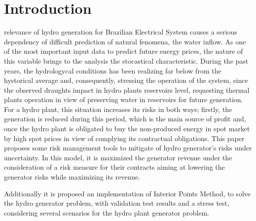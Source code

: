 \documentclass[a4paper]{IEEEtran}
\begin{document}
%
\IEEEpeerreviewmaketitle



\section{Introduction}
% 
% 
% 
% 
 relevance of hydro generation for Brazilian Electrical System causes a serious dependency of difficult prediction of natural fenomena, the water inflow. As one of the most important input data to predict future energy prices, the nature of this variable brings to the analysis the stocastical characteristic. During the past years, the hydrologycal conditions has been realizing far below from the hystorical average and, consequently, stressing the operation of the system, since the observed draughts impact in hydro plants reservoirs level, requesting thermal plants operation in view of preserving water in reservoirs for future generation. For a hydro plant, this situation increases its risks in both ways; firstly, the generation is reduced during this period, which is the main source of profit and, once the hydro plant is obligated to buy the non-produced energy in spot market by high spot prices in view of complying its contractual obligations. This paper proposes some risk management tools to mitigate of hydro generator's risks under uncertainty. In this model, it is maximized the generator revenue under the consideration of a risk measure for their contracts aiming at lowering the generator risks while maximizing its revenue. 

Additionally it is proposed an implementation of Interior Points Method, to solve the hydro generator problem, with validation test results and a stress test, considering several scenarios for the hydro plant generator problem.
\end{document}
